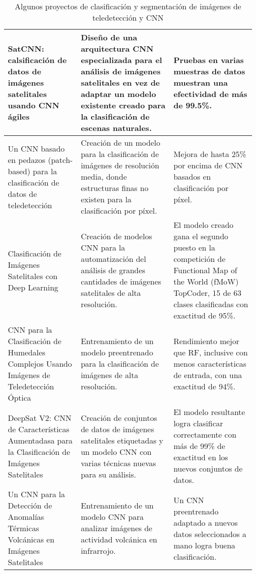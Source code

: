 \begin{center}
\begin{table}[h!]
\begin{tabular}{|m{4cm}|m{5cm}|m{6.2cm}|}
            \hline
            SatCNN: calsificación de datos de imágenes satelitales usando CNN ágiles \autocite{zhong-2016} & Diseño de
            una arquitectura CNN especializada para el análisis de imágenes satelitales en vez de adaptar un modelo
            existente creado para la clasificación de escenas naturales. & Pruebas en varias muestras de datos muestran
            una efectividad de más de 99.5\%. \\
            \hline
            Un CNN basado en pedazos (patch-based) para la clasificación de datos de teledetección
            \autocite{sharma-2017} & Creación de un modelo para la clasificación de imágenes de resolución media, donde
            estructuras finas no existen para la clasificación por píxel. & Mejora de hasta 25\% por encima de CNN
            basados en clasificación por píxel. \\
            \hline
            Clasificación de Imágenes Satelitales con Deep Learning \autocite{pritt-2017} & Creación de modelos CNN
            para la automatización del análisis de grandes cantidades de imágenes satelitales de alta resolución. & El
            modelo creado gana el segundo puesto en la competición de Functional Map of the World (fMoW) TopCoder, 15
            de 63 clases clasificadas con exactitud de 95\%. \\
            \hline
            CNN para la Clasificación de Humedales Complejos Usando Imágenes de Teledetección Óptica
            \autocite{rezaee-2018} & Entrenamiento de un modelo preentrenado para la clasificación de imágenes de alta
            resolución. & Rendimiento mejor que RF, inclusive con menos características de entrada, con una exactitud
            de 94\%. \\
            \hline
            DeepSat V2: CNN de Características Aumentadasa para la Clasificación de Imágenes Satelitales
            \autocite{liu-2019} & Creación de conjuntos de datos de imágenes satelitales etiquetadas y un modelo CNN
            con varias técnicas nuevas para su análisis. & El modelo resultante logra clasificar correctamente con más
            de 99\% de exactitud en los nuevos conjuntos de datos. \\
            \hline
            Un CNN para la Detección de Anomalías Térmicas Volcánicas en Imágenes Satelitales \autocite{amato-2023} &
            Entrenamiento de un modelo CNN para analizar imágenes de actividad volcánica en infrarrojo. & Un CNN
            preentrenado adaptado a nuevos datos seleccionados a mano logra buena clasificación. \\
            \hline
        \end{tabular}
        \caption{Algunos proyectos de clasificación y segmentación de imágenes de teledetección y CNN}
        \label{table:1}
    \end{table}
    \vspace{-\topsep}
\end{center}


